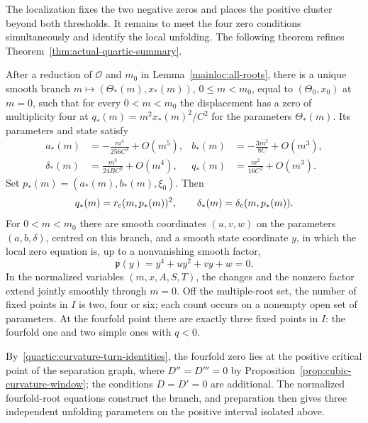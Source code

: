 The localization fixes the two negative zeros and places the positive
cluster beyond both thresholds. It remains to meet the four zero conditions
simultaneously and identify the local unfolding. The following theorem refines
Theorem~\ref{thm:actual-quartic-summary}.

\begin{theorem}
\label{thm:actual-quartic}
After a reduction of $\mathcal O$ and $m_0$ in
Lemma~\ref{mainloc:all-roots}, there is a unique smooth branch
$m\mapsto(\Theta_*(m),x_*(m))$, $0\le m<m_0$, equal to $(\Theta_0,x_0)$ at
$m=0$, such that for every $0<m<m_0$ the displacement has a zero of
multiplicity four at $q_*(m)=m^2x_*(m)^2/C^2$ for the parameters
$\Theta_*(m)$. Its parameters and state satisfy
\begin{equation}\label{quartic:physical-branch}
 \begin{aligned}
 a_*(m)&=-\frac{m^4}{256C^3}+O(m^5),&
 b_*(m)&=-\frac{3m^2}{8C}+O(m^3),\\
 \delta_*(m)&=\frac{m^3}{24BC^2}+O(m^4),&
 q_*(m)&=\frac{m^2}{16C^2}+O(m^3).
 \end{aligned}
\end{equation}
Set $p_*(m)=(a_*(m),b_*(m),\xi_0)$. Then
\begin{equation}\label{quartic:curvature-turn-identities}
 q_*(m)=r_{\rm c}(m,p_*(m))^2,\qquad
 \delta_*(m)=\delta_{\rm c}(m,p_*(m)).
\end{equation}
For $0<m<m_0$ there are smooth coordinates $(u,v,w)$ on the parameters
$(a,b,\delta)$, centred on this branch, and a smooth state coordinate $y$,
in which the local zero equation is, up to a nonvanishing smooth factor,
\begin{equation}\label{quartic:preparation}
 \mathfrak p(y)=y^4+uy^2+vy+w=0.
\end{equation}
In the normalized variables $(m,x,A,S,T)$, the changes and the
nonzero factor extend jointly smoothly through $m=0$. Off the multiple-root
set, the number of fixed points in $I$ is two, four or six; each count occurs
on a nonempty open set of parameters. At the fourfold point there are exactly
three fixed points in $I$: the fourfold one and two simple ones with $q<0$.
\end{theorem}

By~\eqref{quartic:curvature-turn-identities}, the fourfold zero lies at the
positive critical point of the separation graph, where $D''=D'''=0$ by
Proposition~\ref{prop:cubic-curvature-window}; the conditions $D=D'=0$ are
additional. The normalized fourfold-root equations construct the branch, and
preparation then gives three independent unfolding parameters on the positive
interval isolated above.

